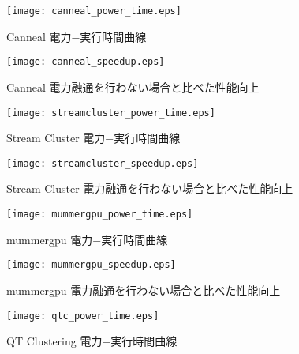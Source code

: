 \begin{figure}[t]
 \begin{center}
  \texttt{[image: canneal\_power\_time.eps]}
 \end{center}
 \caption{Canneal 電力−実行時間曲線}
 \label{fig:canneal_power_time}
\end{figure}

\begin{figure}[t]
 \begin{center}
  \texttt{[image: canneal\_speedup.eps]}
 \end{center}
 \caption{Canneal 電力融通を行わない場合と比べた性能向上}
 \label{fig:canneal_speedup}
\end{figure}

\begin{figure}[t]
 \begin{center}
  \texttt{[image: streamcluster\_power\_time.eps]}
 \end{center}
 \caption{Stream Cluster 電力−実行時間曲線}
 \label{fig:streamcluster_power_time}
\end{figure}

\begin{figure}[t]
 \begin{center}
  \texttt{[image: streamcluster\_speedup.eps]}
 \end{center}
 \caption{Stream Cluster 電力融通を行わない場合と比べた性能向上}
 \label{fig:streamcluster_speedup}
\end{figure}

\begin{figure}[t]
 \begin{center}
  \texttt{[image: mummergpu\_power\_time.eps]}
 \end{center}
 \caption{mummergpu 電力−実行時間曲線}
 \label{fig:mummergpu_power_time}
\end{figure}

\begin{figure}[t]
 \begin{center}
  \texttt{[image: mummergpu\_speedup.eps]}
 \end{center}
 \caption{mummergpu 電力融通を行わない場合と比べた性能向上}
 \label{fig:mummergpu_speedup}
\end{figure}

\begin{figure}[t]
 \begin{center}
  \texttt{[image: qtc\_power\_time.eps]}
 \end{center}
 \caption{QT Clustering 電力−実行時間曲線}
 \label{fig:qtclustering_power_time}
\end{figure}

